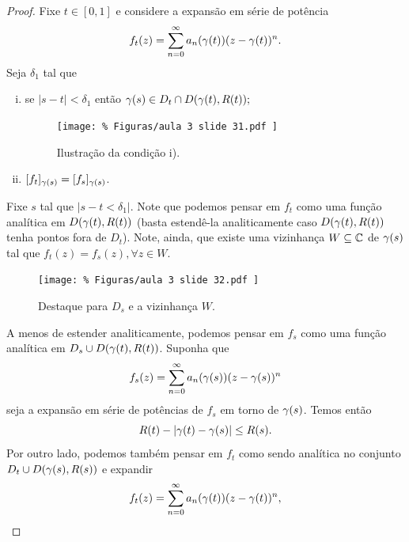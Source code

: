 \begin{proof}
        Fixe $t\in [0,1]$ e considere a expansão em série de potência
        \begin{equation*}
            f_t(z) = \sum_{n=0}^{\infty} a_n(\gamma(t))(z-\gamma(t))^n.
        \end{equation*}
        Seja $\delta_1$ tal que 
        \begin{enumerate}[i)]
            \item se $|s-t|<\delta_1$ então $\gamma(s)\in D_t\cap D(\gamma(t), R(t));$
            \begin{figure}[H]\centering
                \texttt{[image: \%
                    Figuras/aula 3 slide 31.pdf
                ]}
                \caption{%
                    Ilustração da condição i).
                }
            \end{figure}
            \item $[f_t]_{\gamma(s)} = [f_s]_{\gamma(s)}$.
        \end{enumerate}
        Fixe $s$ tal que $|s-t<\delta_1|$. Note que podemos pensar em $f_t$ como uma 
        função analítica em $D(\gamma(t), R(t))$ (basta estendê-la analiticamente caso
        $D(\gamma(t), R(t))$ tenha pontos fora de $D_t$). Note, ainda, que existe uma 
        vizinhança $W\subseteq\mathbb{C}$ de $\gamma(s)$ tal que 
        $f_t(z) = f_s(z), \forall z\in W$.
        \begin{figure}[H]\centering
            \texttt{[image: \%
                Figuras/aula 3 slide 32.pdf
            ]}
            \caption{%
                Destaque para $D_s$ e a vizinhança $W$.
            }
        \end{figure}
        A menos de estender analiticamente, podemos pensar em $f_s$ como uma função analítica
        em $D_s\cup D(\gamma(t), R(t))$. Suponha que
        \begin{equation*}
            f_s(z) = \sum_{n=0}^\infty a_n(\gamma(s))(z-\gamma(s))^n
        \end{equation*}
        seja a expansão em série de potências de $f_s$ em torno de $\gamma(s)$. Temos então
        \begin{equation*}
            R(t) - |\gamma(t) - \gamma(s)| \leq R(s).
        \end{equation*}
        Por outro lado, podemos também pensar em $f_t$ como sendo analítica no conjunto
        $D_t\cup D(\gamma(s), R(s))$ e expandir
        \begin{equation*}
            f_t(z) = \sum_{n=0}^\infty a_n(\y(t))(z-\y(t))^n,

\end{equation*}
\end{proof}
